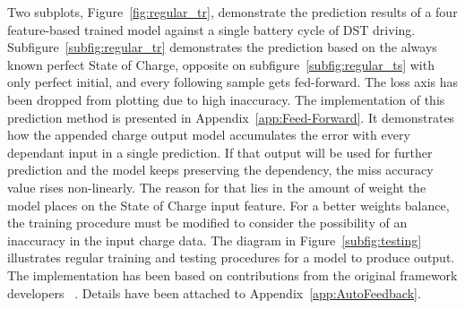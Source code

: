 %
%
Two subplots, Figure~\ref{fig:regular_tr}, demonstrate the prediction results of a four feature-based trained model against a single battery cycle of DST driving.
Subfigure~\ref{subfig:regular_tr} demonstrates the prediction based on the always known perfect State of Charge, opposite on subfigure~\ref{subfig:regular_ts} with only perfect initial, and every following sample gets fed-forward.
The loss axis has been dropped from plotting due to high inaccuracy.
The implementation of this prediction method is presented in Appendix~\ref{app:Feed-Forward}.
It demonstrates how the appended charge output model accumulates the error with every dependant input in a single prediction.
If that output will be used for further prediction and the model keeps preserving the dependency, the miss accuracy value rises non-linearly.
The reason for that lies in the amount of weight the model places on the State of Charge input feature.
For a better weights balance, the training procedure must be modified to consider the possibility of an inaccuracy in the input charge data.
The diagram in Figure~\ref{subfig:testing} illustrates regular training and testing procedures for a model to produce output.
The implementation has been based on contributions from the original framework developers ~\cite{time_2020}.
Details have been attached to Appendix~\ref{app:AutoFeedback}.
